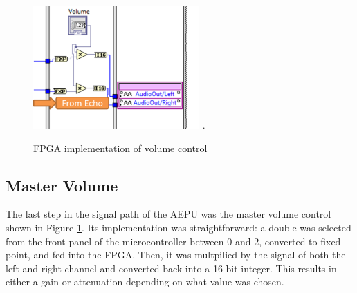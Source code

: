 \begin{figure}[!t]
\centering
\includegraphics[width=2.5in]{volume.png}
\DeclareGraphicsExtensions.
\caption{FPGA implementation of volume control}
\label{fig_volume}
\end{figure} 

\subsection{Master Volume}

The last step in the signal path of the AEPU was the master volume control shown in Figure \ref{fig_volume}.
Its implementation was straightforward: a double was selected from the front-panel of the microcontroller between 0 and 2, converted to fixed point, and fed into the FPGA.
Then, it was multpilied by the signal of both the left and right channel and converted back into a 16-bit integer.
This results in either a gain or attenuation depending on what value was chosen.

%
%

